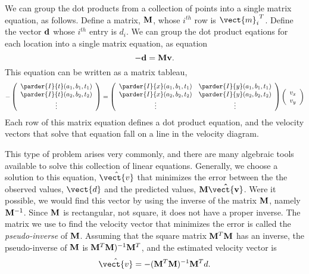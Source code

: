 We can group the dot products from a collection of points into a
single matrix equation, as follows.
Define a matrix, $\bf M$, whose $i^{th}$ row is ${\vect{m}_i}^T$.
Define the vector $\bf d$ whose $i^{th}$ entry is $d_i$.
We can group the dot product eqations for each location into a single
matrix equation, as
equation
\begin{equation}
{\bf -d = M v }.
\end{equation}
This equation can be written as a matrix tableau,
\begin{equation}
- \left(
 \begin{array}{c}
  \parder{I}{t}(a_1,b_1,t_1) \\
  \parder{I}{t}(a_2,b_2,t_2) \\
  \vdots
 \end{array}
\right)
 = 
\left ( 
 \begin{array}{cc}
  \parder{I}{x}(a_1,b_1,t_1) & \parder{I}{y}(a_1,b_1,t_1) \\ 
  \parder{I}{x}(a_2,b_2,t_2) & \parder{I}{y}(a_2,b_2,t_2) \\ 
  \vdots  & \vdots
 \end{array}
\right )
\left (
 \begin{array}{c}
 v_x \\
 v_y
 \end{array}
\right ) 
\end{equation}
Each row of this matrix equation defines a dot product equation, and
the velocity vectors that solve that equation fall on a line in the
velocity diagram.

This type of problem arises very commonly, and there are many
algebraic tools available to solve this collection of linear
equations.  Generally, we choose a solution to this equation,
$\hat{\vect{v}}$ that minimizes the error between the the observed
values, $\vect{d}$ and the predicted values, $\bf M \hat{\vect{v}}$.
Were it possible, we would find this vector by using the inverse of
the matrix $\bf M$, namely ${\bf M}^{-1}$.  Since $\bf M$ is
rectangular, not square, it does not have a proper inverse.  The
matrix we use to find the velocity vector that minimizes the error is
called the {\em pseudo-inverse} of $\bf M$.  Assuming that the square
matrix ${\bf M}^T {\bf M}$ has an inverse, the pseudo-inverse of $\bf
M$ is ${\bf M}^{T} {\bf M})^{-1} {\bf M}^{T}$, and the estimated
velocity vector is
\begin{equation}
\label{e9:motionFlow}
\hat{\vect{v}} = - ( {\bf M}^{T} {\bf M})^{-1} {\bf M}^{T} d .
\end{equation}


